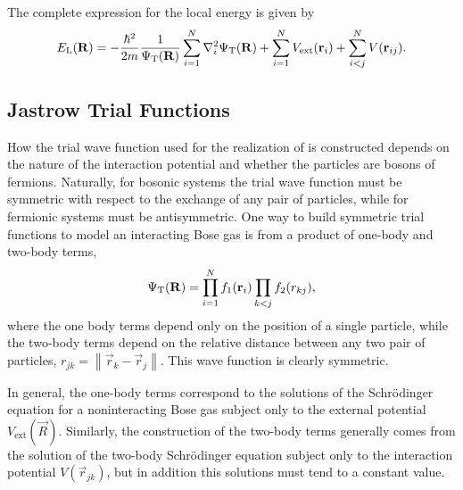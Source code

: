 The complete expression for the local energy is given by
%
\begin{equation}
	\label{eq:local-energy}
	E_{\mathrm{L}}(\mathbf R) = -\frac{\hbar^2}{2m} \frac{1}{\Psi_{\mathrm{T}}(\mathbf R)} \sum_{i=1}^{N} \mathbf{\nabla}^2_{i} \Psi_{\mathrm{T}}(\mathbf R) +
	\sum_{i=1}^{N} V_{\mathrm{ext}}(\mathbf r_i) + \sum_{i < j}^{N} V(\mathbf{r}_{ij}).
\end{equation}




\subsection{Jastrow Trial Functions}

How the trial wave function used for the realization of {\VMC} is constructed
depends on the nature of the interaction potential and whether the particles are
bosons of fermions. Naturally, for bosonic systems the trial wave function must
be symmetric with respect to the exchange of any pair of particles, while for
fermionic systems must be antisymmetric. One way to build symmetric trial
functions to model an interacting Bose gas is from a product of one-body and
two-body terms,
%
\begin{equation}
	\label{eq:vmc-jastrow-trial-function}
	\Psi_{\mathrm{T}}(\mathbf R) = \prod_{i=1}^{N} f_1(\mathbf r_i) \prod_{k < j} f_2(r_{kj}),
\end{equation}
%
where the one body terms depend only on the position of a single particle, while
the two-body terms depend on the relative distance between any two pair of
particles, $r_{jk} = \left\| \vec r_k - \vec r_j \right\|$. This wave function
is clearly symmetric.

In general, the one-body terms correspond to the solutions of the Schrödinger
equation for a noninteracting Bose gas subject only to the external potential
$V_{\textrm{ext}}(\vec R)$. Similarly, the construction of the two-body terms
generally comes from the solution of the two-body Schrödinger equation subject
only to the interaction potential $V(\vec r_{jk})$, but in addition this
solutions must tend to a constant value.




